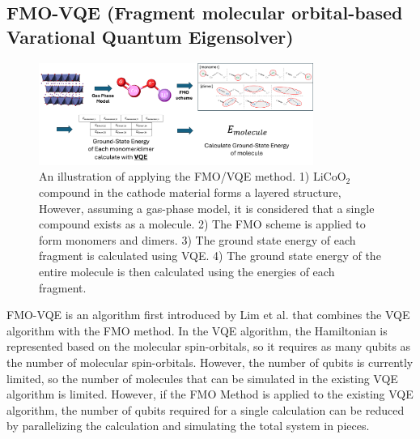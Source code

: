 \documentclass[pdflatex,sn-mathphys-num]{sn-jnl}%
\theoremstyle{thmstyleone}%
\theoremstyle{thmstyletwo}%
\theoremstyle{thmstylethree}%
\begin{document}
\subsection{FMO-VQE (Fragment molecular orbital-based Varational Quantum Eigensolver)}\label{subsec2.4}
\begin{figure}[H]
\centering
\includegraphics[width=0.8\textwidth]{fig/FMO_VQE_schme.png}
\caption{An illustration of applying the FMO/VQE method. 1) \(\mathrm{LiCoO_2}\) compound in the cathode material forms a layered structure, However, assuming a gas-phase model, it is considered that a single compound exists as a molecule. 2) The FMO scheme is applied to form monomers and dimers. 3) The ground state energy of each fragment is calculated using VQE. 4) The ground state energy of the entire molecule is then calculated using the energies of each fragment.}\label{Fig.5}
\end{figure}
FMO-VQE is an algorithm first introduced by Lim et al. that combines the VQE algorithm with the FMO method. In the VQE algorithm, the Hamiltonian is represented based on the molecular spin-orbitals, so it requires as many qubits as the number of molecular spin-orbitals. However, the number of qubits is currently limited, so the number of molecules that can be simulated in the existing VQE algorithm is limited. However, if the FMO Method is applied to the existing VQE algorithm, the number of qubits required for a single calculation can be reduced by parallelizing the calculation and simulating the total system in pieces. 
\end{document}
